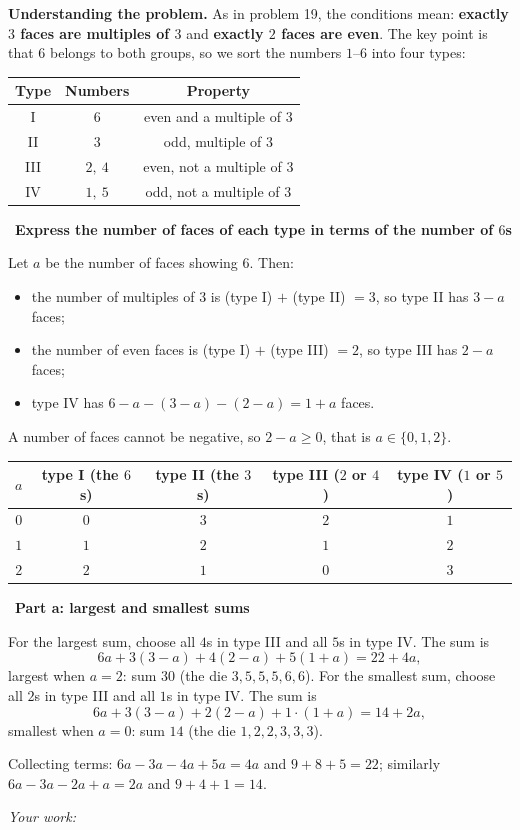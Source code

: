 \documentclass[11pt]{article}
\newif\ifsol \solfalse
\newcommand{\StuProb}[2]{\begin{probboxS}{#1}{#2}\StuProbBody\end{probboxS}}
\newcommand{\probsol}[1]{%
  \begin{lrbox}{\solmeasure}\begin{minipage}{\dimexpr\linewidth-24pt\relax}#1\end{minipage}\end{lrbox}%
  \ifsol
    \begin{solbox}#1\end{solbox}%
  \else
    \setlength{\solht}{\dimexpr\ht\solmeasure+\dp\solmeasure+0.85cm\relax}%
    \ifdim\solht<1.35cm\setlength{\solht}{1.35cm}\fi
    \ifdim\solht>\StudentMaxWork\setlength{\solht}{\StudentMaxWork}\fi
    \par\noindent\begin{minipage}{\linewidth}%
    \expandafter\StuProb\StuProbArgs
    \begin{tcolorbox}[colback=white,colframe=Line,boxrule=0.8pt,arc=5pt,
      left=8pt,right=8pt,top=4pt,bottom=4pt,height=\solht]{\footnotesize\color{Slate}\itshape\WorkWord}\end{tcolorbox}%
    \end{minipage}\par\medskip
  \fi}
\newlength{\StudentMaxWork}\setlength{\StudentMaxWork}{4.5cm}
\newcommand{\step}[2]{\par\smallskip\noindent{\bfseries\color{tmBlue!85!black}\StepWord~#1.}\ {\bfseries #2}\par\nopagebreak}
\def\WorkWord{Your work:}
\def\StepWord{Step}
\begin{document}
\probsol{
\textbf{Understanding the problem.} As in problem 19, the conditions mean: \textbf{exactly $3$ faces are multiples of $3$} and
\textbf{exactly $2$ faces are even}. The key point is that $6$ belongs to both groups, so we sort the numbers $1$--$6$ into four types:
\begin{center}\begin{tabular}{|c|c|c|}\hline
Type & Numbers & Property\\\hline
I & $6$ & even and a multiple of $3$\\\hline
II & $3$ & odd, multiple of $3$\\\hline
III & $2,\ 4$ & even, not a multiple of $3$\\\hline
IV & $1,\ 5$ & odd, not a multiple of $3$\\\hline
\end{tabular}\end{center}

\step{1}{Express the number of faces of each type in terms of the number of $6$s}
Let $a$ be the number of faces showing $6$. Then:
\begin{itemize}[leftmargin=1.2em,itemsep=1pt,topsep=2pt]
\item the number of multiples of $3$ is (type I) $+$ (type II) $=3$, so type II has $3-a$ faces;
\item the number of even faces is (type I) $+$ (type III) $=2$, so type III has $2-a$ faces;
\item type IV has $6-a-(3-a)-(2-a)=1+a$ faces.
\end{itemize}
A number of faces cannot be negative, so $2-a\ge0$, that is $a\in\{0,1,2\}$.
\begin{center}\begin{tabular}{|c|c|c|c|c|}\hline
$a$ & type I (the $6$s) & type II (the $3$s) & type III ($2$ or $4$) & type IV ($1$ or $5$)\\\hline
$0$ & $0$ & $3$ & $2$ & $1$\\\hline
$1$ & $1$ & $2$ & $1$ & $2$\\\hline
$2$ & $2$ & $1$ & $0$ & $3$\\\hline
\end{tabular}\end{center}

\step{2}{Part a: largest and smallest sums}
For the largest sum, choose all $4$s in type III and all $5$s in type IV. The sum is
\[6a+3(3-a)+4(2-a)+5(1+a)=22+4a,\]
largest when $a=2$: sum $30$ (the die $3,5,5,5,6,6$).
For the smallest sum, choose all $2$s in type III and all $1$s in type IV. The sum is
\[6a+3(3-a)+2(2-a)+1\cdot(1+a)=14+2a,\]
smallest when $a=0$: sum $14$ (the die $1,2,2,3,3,3$).
\begin{recallbox}Collecting terms: $6a-3a-4a+5a=4a$ and $9+8+5=22$; similarly $6a-3a-2a+a=2a$ and $9+4+1=14$.\end{recallbox}

}
\end{document}
